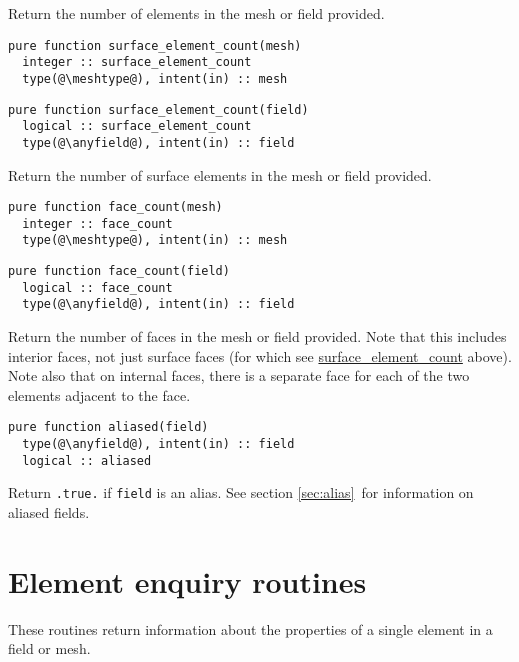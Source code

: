 \documentclass[a4paper, 11pt]{book}
\begin{document}
Return the number of elements in the mesh or field provided.


\begin{lstlisting}
pure function surface_element_count(mesh)
  integer :: surface_element_count
  type(@\meshtype@), intent(in) :: mesh
\end{lstlisting}

\begin{lstlisting}
pure function surface_element_count(field)
  logical :: surface_element_count
  type(@\anyfield@), intent(in) :: field
\end{lstlisting}

Return the number of surface elements in the mesh or field provided.


\begin{lstlisting}
pure function face_count(mesh)
  integer :: face_count
  type(@\meshtype@), intent(in) :: mesh
\end{lstlisting}

\begin{lstlisting}
pure function face_count(field)
  logical :: face_count
  type(@\anyfield@), intent(in) :: field
\end{lstlisting}

Return the number of faces in the mesh or field provided. Note that this
includes interior faces, not just surface faces (for which see
\hyperlink{proc:surfaceelementcount}{surface\_element\_count} above). Note
also that on internal faces, there is a separate face for each of the two
elements adjacent to the face.


\begin{lstlisting}
pure function aliased(field)
  type(@\anyfield@), intent(in) :: field
  logical :: aliased
\end{lstlisting}

Return \lstinline+.true.+ if \lstinline+field+ is an alias. See section
\ref{sec:alias}\ for information on aliased fields.


\section{Element enquiry routines}

These routines return information about the properties of a single element
in a field or mesh.
\end{document}

